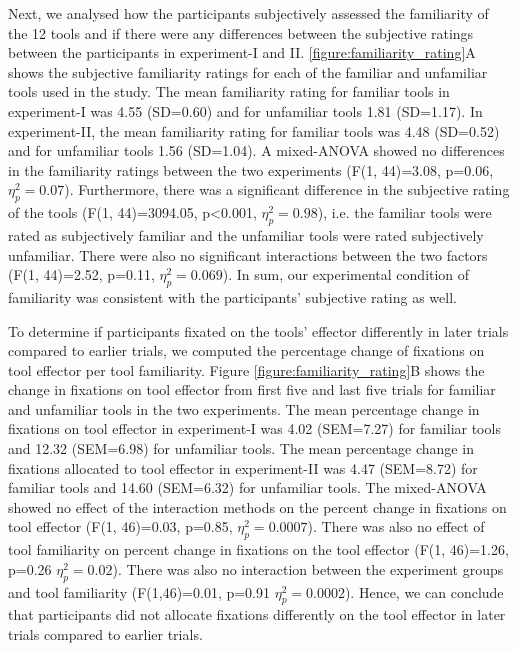 Next, we analysed how the participants subjectively assessed the familiarity of the 12 tools and if there were any differences between the subjective ratings between the participants in experiment-I and II. \ref{figure:familiarity_rating}A shows the subjective familiarity ratings for each of the familiar and unfamiliar tools used in the study. The mean familiarity rating for familiar tools in experiment-I was 4.55 (SD=0.60) and for unfamiliar tools 1.81 (SD=1.17). In experiment-II, the mean familiarity rating for familiar tools was 4.48 (SD=0.52) and for unfamiliar tools 1.56 (SD=1.04). A mixed-ANOVA showed no differences in the familiarity ratings between the two experiments (F(1, 44)=3.08, p=0.06, $\eta_p^2 = 0.07$). Furthermore, there was a significant difference in the subjective rating of the tools (F(1, 44)=3094.05, p<0.001, $\eta_p^2=0.98$), i.e. the familiar tools were rated as subjectively familiar and the unfamiliar tools were rated subjectively unfamiliar. There were also no significant interactions between the two factors (F(1, 44)=2.52, p=0.11, $\eta_p^2=0.069$). In sum, our experimental condition of familiarity was consistent with the participants’ subjective rating as well. 

To determine if participants fixated on the tools' effector differently in later trials compared to earlier trials, we computed the percentage change of fixations on tool effector per tool familiarity. Figure \ref{figure:familiarity_rating}B shows the change in fixations on tool effector from first five and last five trials for familiar and unfamiliar tools in the two experiments. The mean percentage change in fixations on tool effector in experiment-I was 4.02 (SEM=7.27) for familiar tools and 12.32 (SEM=6.98) for unfamiliar tools. The mean percentage change in fixations allocated to tool effector in experiment-II was 4.47 (SEM=8.72) for familiar tools and 14.60 (SEM=6.32) for unfamiliar tools. The mixed-ANOVA showed no effect of the interaction methods on the percent change in fixations on tool effector (F(1, 46)=0.03, p=0.85, $\eta_p^2 = 0.0007$). There was also no effect of tool familiarity on percent change in fixations on the tool effector (F(1, 46)=1.26, p=0.26 $\eta_p^2 = 0.02$). There was also no interaction between the experiment groups and tool familiarity (F(1,46)=0.01, p=0.91 $\eta_p^2 = 0.0002$). Hence, we can conclude that participants did not allocate fixations differently on the tool effector in later trials compared to earlier trials.  


